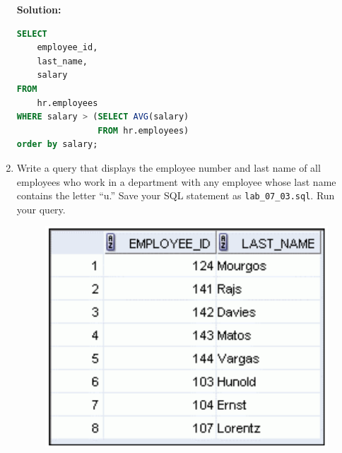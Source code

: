 \documentclass[a4paper,12pt]{article}
\begin{document}
\begin{enumerate}
    \textbf{Solution: }
    \begin{lstlisting}[language=SQL]
SELECT 
    employee_id, 
    last_name, 
    salary
FROM 
    hr.employees
WHERE salary > (SELECT AVG(salary) 
                FROM hr.employees)
order by salary;
    \end{lstlisting}
    \item Write a query that displays the employee number and last name of all employees who work in a
department with any employee whose last name contains the letter “u.” Save your SQL
statement as \texttt{lab\_07\_03.sql}. Run your query.
    \begin{figure}[h]
        \centering
            \centering
            \includegraphics[width=.5\linewidth]{graphics/73.png}
    \end{figure}
    

\end{enumerate}
\end{document}
